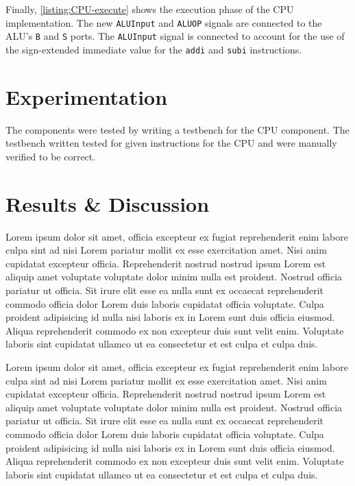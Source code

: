 \documentclass[11pt]{report}
\begin{document}

Finally, \ref{listing:CPU-execute} shows the execution phase of the CPU implementation. The new
\verb|ALUInput| and \verb|ALUOP| signals are connected to the ALU's \verb|B| and \verb|S| ports. The
\verb|ALUInput| signal is connected to account for the use of the sign-extended immediate value for
the \verb|addi| and \verb|subi| instructions.

\section*{Experimentation}
The components were tested by writing a testbench for the CPU component. The testbench written
tested for given instructions for the CPU and were manually verified to be correct.

\newpage

\section*{Results \& Discussion}
Lorem ipsum dolor sit amet, officia excepteur ex fugiat reprehenderit enim labore culpa sint ad nisi
Lorem pariatur mollit ex esse exercitation amet. Nisi anim cupidatat excepteur officia.
Reprehenderit nostrud nostrud ipsum Lorem est aliquip amet voluptate voluptate dolor minim nulla est
proident. Nostrud officia pariatur ut officia. Sit irure elit esse ea nulla sunt ex occaecat
reprehenderit commodo officia dolor Lorem duis laboris cupidatat officia voluptate. Culpa proident
adipisicing id nulla nisi laboris ex in Lorem sunt duis officia eiusmod. Aliqua reprehenderit
commodo ex non excepteur duis sunt velit enim. Voluptate laboris sint cupidatat ullamco ut ea
consectetur et est culpa et culpa duis.

Lorem ipsum dolor sit amet, officia excepteur ex fugiat reprehenderit enim labore culpa sint ad nisi
Lorem pariatur mollit ex esse exercitation amet. Nisi anim cupidatat excepteur officia.
Reprehenderit nostrud nostrud ipsum Lorem est aliquip amet voluptate voluptate dolor minim nulla est
proident. Nostrud officia pariatur ut officia. Sit irure elit esse ea nulla sunt ex occaecat
reprehenderit commodo officia dolor Lorem duis laboris cupidatat officia voluptate. Culpa proident
adipisicing id nulla nisi laboris ex in Lorem sunt duis officia eiusmod. Aliqua reprehenderit
commodo ex non excepteur duis sunt velit enim. Voluptate laboris sint cupidatat ullamco ut ea
consectetur et est culpa et culpa duis.
\end{document}
